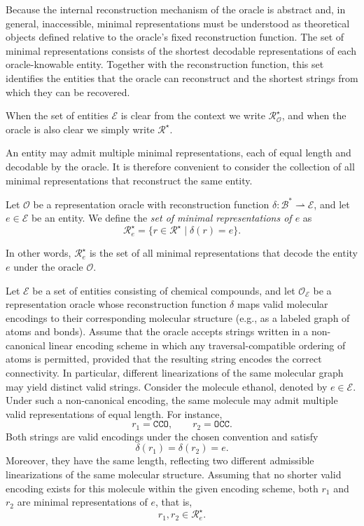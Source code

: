Because the internal reconstruction mechanism of the oracle is abstract and, in general, inaccessible, minimal representations must be understood as theoretical objects defined relative to the oracle's fixed reconstruction function. The set of minimal representations consists of the shortest decodable representations of each oracle-knowable entity. Together with the reconstruction function, this set identifies the entities that the oracle can reconstruct and the shortest strings from which they can be recovered.

\begin{notation}
When the set of entities $\mathcal{E}$ is clear from the context we write $\mathcal{R}^{\star}_{\mathcal{O}}$, and when the oracle is also clear we simply write $\mathcal{R}^{\star}$.
\end{notation}

An entity may admit multiple minimal representations, each of equal length and decodable by the oracle. It is therefore convenient to consider the collection of all minimal representations that reconstruct the same entity.

\begin{definition}
Let $\mathcal{O}$ be a representation oracle with reconstruction function $\delta : \mathcal{B}^\ast \rightharpoonup \mathcal{E}$, and let $e \in \mathcal{E}$ be an entity. We define the \emph{set of minimal representations of $e$} as
\[
\mathcal{R}^{\star}_{e} = \bigl\{r \in \mathcal{R}^{\star} \;\big|\; \delta(r)=e \bigr\}.
\]
\end{definition}

In other words, $\mathcal{R}^{\star}_{e}$ is the set of all minimal representations that decode the entity $e$ under the oracle $\mathcal{O}$.

\begin{example}
Let $\mathcal{E}$ be a set of entities consisting of chemical compounds, and let $\mathcal{O}_{\mathcal{E}}$ be a representation oracle whose reconstruction function $\delta$ maps valid molecular encodings to their corresponding molecular structure (e.g., as a labeled graph of atoms and bonds). Assume that the oracle accepts strings written in a non-canonical linear encoding scheme in which any traversal-compatible ordering of atoms is permitted, provided that the resulting string encodes the correct connectivity. In particular, different linearizations of the same molecular graph may yield distinct valid strings. Consider the molecule ethanol, denoted by $e \in \mathcal{E}$. Under such a non-canonical encoding, the same molecule may admit multiple valid representations of equal length. For instance,
\[
r_1 = \texttt{CCO}, \qquad r_2 = \texttt{OCC}.
\]
Both strings are valid encodings under the chosen convention and satisfy
\[
\delta(r_1)=\delta(r_2)=e.
\]
Moreover, they have the same length, reflecting two different admissible linearizations of the same molecular structure. Assuming that no shorter valid encoding exists for this molecule within the given encoding scheme, both $r_1$ and $r_2$ are minimal representations of $e$, that is,
\[
r_1, r_2 \in \mathcal{R}^\star_e.
\]
\end{example} 

